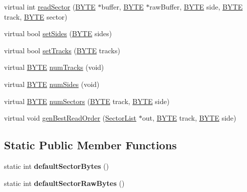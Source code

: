 \begin{DoxyCompactItemize}
\item 
virtual int \hyperlink{classHeathHSDisk_aacdbaa5d65b123852e743f2579f38cda}{read\+Sector} (\hyperlink{hi__types_8h_aae9749d96e15ccb4f482dd5f55d98f9b}{B\+Y\+T\+E} $\ast$buffer, \hyperlink{hi__types_8h_aae9749d96e15ccb4f482dd5f55d98f9b}{B\+Y\+T\+E} $\ast$raw\+Buffer, \hyperlink{hi__types_8h_aae9749d96e15ccb4f482dd5f55d98f9b}{B\+Y\+T\+E} side, \hyperlink{hi__types_8h_aae9749d96e15ccb4f482dd5f55d98f9b}{B\+Y\+T\+E} track, \hyperlink{hi__types_8h_aae9749d96e15ccb4f482dd5f55d98f9b}{B\+Y\+T\+E} sector)
\item 
virtual bool \hyperlink{classHeathHSDisk_aecbd15c4883c1ecbd5f10c472b98e4b5}{set\+Sides} (\hyperlink{hi__types_8h_aae9749d96e15ccb4f482dd5f55d98f9b}{B\+Y\+T\+E} sides)
\item 
virtual bool \hyperlink{classHeathHSDisk_a5b18d456e9b63e72e9d4c5ac41bc7dd2}{set\+Tracks} (\hyperlink{hi__types_8h_aae9749d96e15ccb4f482dd5f55d98f9b}{B\+Y\+T\+E} tracks)
\item 
virtual \hyperlink{hi__types_8h_aae9749d96e15ccb4f482dd5f55d98f9b}{B\+Y\+T\+E} \hyperlink{classDisk_afeeca1516865154ea3fa3380a784e0c9}{num\+Tracks} (void)
\item 
virtual \hyperlink{hi__types_8h_aae9749d96e15ccb4f482dd5f55d98f9b}{B\+Y\+T\+E} \hyperlink{classDisk_aacfb8782312379d5d6bc65d3c852d864}{num\+Sides} (void)
\item 
virtual \hyperlink{hi__types_8h_aae9749d96e15ccb4f482dd5f55d98f9b}{B\+Y\+T\+E} \hyperlink{classDisk_a06365b69899e40c025086108ce433376}{num\+Sectors} (\hyperlink{hi__types_8h_aae9749d96e15ccb4f482dd5f55d98f9b}{B\+Y\+T\+E} track, \hyperlink{hi__types_8h_aae9749d96e15ccb4f482dd5f55d98f9b}{B\+Y\+T\+E} side)
\item 
virtual void \hyperlink{classDisk_a01a51ea25554387f047fb474c0814d53}{gen\+Best\+Read\+Order} (\hyperlink{disk_8h_structSectorList}{Sector\+List} $\ast$out, \hyperlink{hi__types_8h_aae9749d96e15ccb4f482dd5f55d98f9b}{B\+Y\+T\+E} track, \hyperlink{hi__types_8h_aae9749d96e15ccb4f482dd5f55d98f9b}{B\+Y\+T\+E} side)
\end{DoxyCompactItemize}
\subsection*{Static Public Member Functions}
\begin{DoxyCompactItemize}
\item 
\hypertarget{classHeathHSDisk_ae95b449d97e9d6e934b5205cadcec8e8}{}static int {\bfseries default\+Sector\+Bytes} ()\label{classHeathHSDisk_ae95b449d97e9d6e934b5205cadcec8e8}

\item 
\hypertarget{classHeathHSDisk_a4cb077c273a6d7f7190faa8cbfcebd3f}{}static int {\bfseries default\+Sector\+Raw\+Bytes} ()\label{classHeathHSDisk_a4cb077c273a6d7f7190faa8cbfcebd3f}

\end{DoxyCompactItemize}
